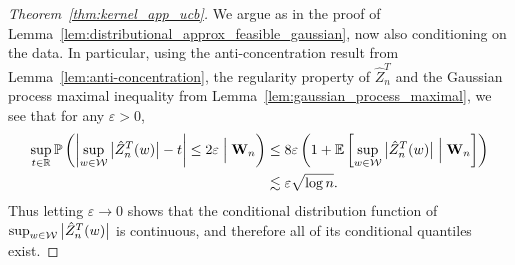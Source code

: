 \begin{proof}[Theorem~\ref{thm:kernel_app_ucb}]


  We argue as in the proof of
  Lemma~\ref{lem:distributional_approx_feasible_gaussian},
  now also conditioning on the data.
  In particular, using the anti-concentration result from
  Lemma~\ref{lem:anti-concentration},
  the regularity property of $\hat Z_n^T$
  and the Gaussian process maximal inequality from
  Lemma~\ref{lem:gaussian_process_maximal},
  we see that for any $\varepsilon > 0$,
  \begin{align*}
    \sup_{t \in \mathbb{R}}
    \mathbb{P}\left(
      \left|
      \sup_{w \in \mathcal{W}}
      \big| \hat Z_n^T(w) \big|
      - t
      \right|
      \leq 2\varepsilon
      \Bigm\vert \mathbf{W}_n
    \right)
    &\leq
    8 \varepsilon
    \left(
      1 + \mathbb{E}\left[
        \sup_{w \in \mathcal{W}}
        \big| \hat Z_n^T(w) \big|
        \Bigm\vert \mathbf{W}_n
      \right]
    \right) \\
    &\lesssim \varepsilon \sqrt{\log n}.
  \end{align*}
  Thus letting $\varepsilon \to 0$
  shows that the conditional distribution function of
  $\sup_{w \in \mathcal{W}} \big|\hat Z_n^T(w)\big|$
  is continuous,
  and therefore all of its conditional quantiles exist.



\end{proof}
